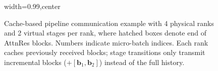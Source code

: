 \begin{figure}[t]
\begin{adjustbox}{width=0.99\textwidth,center}
\begin{tikzpicture}
        \end{tikzpicture}
    \end{adjustbox}
    \caption{
    Cache-based pipeline communication example with 4 physical ranks and 2 virtual stages per rank, where hatched boxes denote end of AttnRes blocks.
    Numbers indicate micro-batch indices. Each rank caches previously received blocks; stage transitions only transmit incremental blocks ($+[\bm{b}_1, \bm{b}_2]$) instead of the full history.
    }
    \label{fig:pipeline}
\end{figure}
